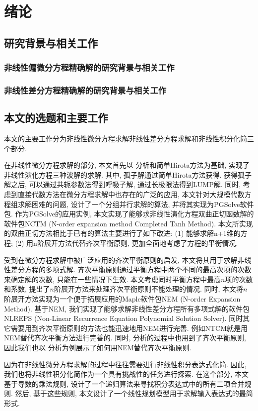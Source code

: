 \chapter{绪论} 
\section{研究背景与相关工作}
\subsection{非线性偏微分方程精确解的研究背景与相关工作}
\subsection{非线性差分方程精确解的研究背景与相关工作}
\section{本文的选题和主要工作}
本文的主要工作分为非线性微分方程求解\zdh 非线性差分方程求解和非线性积分化简三个部分.

在非线性微分方程求解的部分, 本文首先以\Painleve{} 分析和简单Hirota方法为基础, 实现了非线性演化方程三种波解的求解. 其中, 孤子解通过简单Hirota方法获得. 获得孤子解之后, 可以通过共轭参数法得到呼吸子解, 通过长极限法得到LUMP解. 同时, 考虑到直接代数方法在微分方程求解中也存在的广泛的应用, 本文针对大规模代数方程组求解困难的问题, 设计了一个分组并行求解的算法, 并将其实现为PGSolve软件包. 作为PGSolve的应用实例, 本文实现了能够求非线性演化方程双曲正切函数解的软件包NCTM (N-order expansion method Completed Tanh Method). 本文所实现的双曲正切方法相比于已有的算法主要进行了如下改进: (1) 能够求解n+1维的方程; (2) 用n阶展开方法代替齐次平衡原则, 更加全面地考虑了方程的平衡情况.

受到在微分方程求解中被广泛应用的齐次平衡原则的启发, 本文将其用于求解非线性差分方程的多项式解. 齐次平衡原则通过平衡方程中两个不同的最高次项的次数来确定解的次数, 只能在一些情况下生效. 本文考虑同时平衡方程中最高$n$项的次数和系数, 提出了$n$阶展开方法来处理齐次平衡原则不能处理的情况. 同时, 本文将$n$阶展开方法实现为一个便于拓展应用的Maple软件包NEM (N-order Expansion Method). 基于NEM, 我们实现了能够求解非线性差分方程所有多项式解的软件包NLREPS (Non-Linear Recurrence Equation Polynomial Solution Solver). 同时其它需要用到齐次平衡原则的方法也能迅速地用NEM进行完善. 例如NTCM就是用NEM替代齐次平衡方法进行完善的. 同时, \Painleve{} 分析的过程中也用到了齐次平衡原则, 因此我们也以\Painleve{} 分析为例展示了如何用NEM替代齐次平衡原则.

因为在非线性微分方程求解的过程中往往需要进行非线性积分表达式化简. 因此, 我们也将非线性积分化简作为一个具有挑战性的任务进行探索. 在这个部分, 本文基于导数的乘法规则, 设计了一个递归算法来寻找积分表达式中的所有二项合并规则. 然后, 基于这些规则, 本文设计了一个线性规划模型用于求解输入表达式的最简形式.

